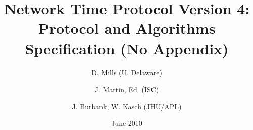 \documentclass{book}
\begin{document}
  \frenchspacing
  \title{Network Time Protocol Version 4: Protocol and Algorithms Specification (No Appendix)}
  \author{D. Mills (U. Delaware) \and J. Martin, Ed. (ISC) \and J. Burbank, W. Kasch (JHU/APL)}
  \date{June 2010}
  \maketitle
  \restoregeometry
  
  
  
  \tableofcontents
  
  
  
  
  
  
  
  
  
  
  
  
  
  
  
  
  
  
  
\end{document}
